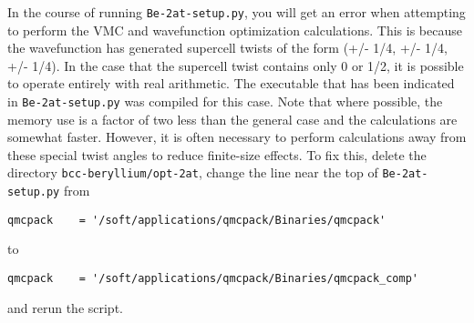 In the course of running \texttt{Be-2at-setup.py}, you will get an error when attempting to perform the VMC and wavefunction optimization calculations.  This is because the wavefunction has generated supercell twists of the form (+/- 1/4, +/- 1/4, +/- 1/4).  In the case that the supercell twist contains only 0 or 1/2, it is possible to operate entirely with real arithmetic.  The executable that has been indicated in \texttt{Be-2at-setup.py} was compiled for this case.  Note that where possible, the memory use is a factor of two less than the general case and the calculations are somewhat faster.  However, it is often necessary to perform calculations away from these special twist angles to reduce finite-size effects.  To fix this, delete the directory \texttt{bcc-beryllium/opt-2at}, change the line near the top of \texttt{Be-2at-setup.py} from 
\begin{lstlisting}[style=Python]
qmcpack    = '/soft/applications/qmcpack/Binaries/qmcpack'
\end{lstlisting}
to
\begin{lstlisting}[style=Python]
qmcpack    = '/soft/applications/qmcpack/Binaries/qmcpack_comp'
\end{lstlisting}
and rerun the script.

